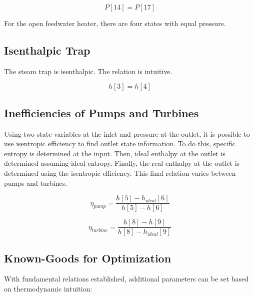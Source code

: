 \documentclass[10pt,cleanfoot]{asme2ej}
\begin{document}
\begin{equation}
P[14] = P[17]
\label{Isobaric device}
\end{equation}

For the open feedwater heater, there are four states with equal pressure.

\subsection{Isenthalpic Trap}

The steam trap is isenthalpic. The relation is intuitive.

\begin{equation}
h[3] = h[4]
\label{Isobaric device}
\end{equation}

\subsection{Inefficiencies of Pumps and Turbines}

Using two state variables at the inlet and pressure at the outlet, it is possible to use isentropic efficiency to find outlet state information. To do this, specific entropy is determined at the input. Then, ideal enthalpy at the outlet is determined assuming ideal entropy. Finally, the real enthalpy at the outlet is determined using the isentropic efficiency. This final relation varies between pumps and turbines.

\begin{equation}
\eta_{pump} = \frac{h[5] - h_{ideal}[6]}{h[5] - h[6]}
\label{Pump entropy}
\end{equation}

\begin{equation}
\eta_{turbine} = \frac{h[8] - h[9]}{h[8] - h_{ideal}[9]}
\label{Turbine entropy}
\end{equation}

\subsection{Known-Goods for Optimization}

With fundamental relations established, additional parameters can be set based on thermodynamic intuition:
\end{document}
